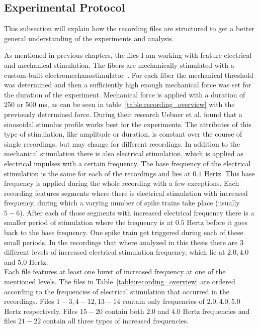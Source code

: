 \subsection{Experimental Protocol}
This subsection will explain how the recording files are structured to get a better general understanding of the experiments and analysis.

As mentioned in previous chapters, the files I am working with feature electrical and mechanical stimulation. The fibers are mechanically stimulated with a custom-built electromechanostimulator~\cite{roberto}. For each fiber the mechanical threshold was determined and then a sufficiently high enough mechanical force was set for the duration of the experiment.
Mechanical force is applied with a duration of 250 or 500 ms, as can be seen in table~\ref{table:recording_overview} with the previously determined force. During their research Uebner et al. found that a sinosoidal stimulus profile works best for the experiments. The attributes of this type of stimulation, like amplitude or duration, is constant over the course of single recordings, but may change  for different recordings. In addition to the mechanical stimulation there is also electrical stimulation, which is applied as electrical impulses with a certain frequency. The base frequency of the electrical stimulation is the same for each of the recordings and lies at $0.1$ Hertz. This base frequency is applied during the whole recording with a few exceptions. Each recording features segments where there is electrical stimulation with increased frequency, during which a varying number of spike trains take place (usually $5-6$). After each of those segments with increased electrical frequency there is a smaller period of stimulation where the frequency is at $0.5$ Hertz before it goes back to the base frequency. One spike train get triggered during each of these small periods. In the recordings that where analyzed in this thesis there are 3 different levels of increased electrical stimulation frequency, which lie at $2.0, 4.0$ and $5.0$ Hertz.\\
Each file features at least one burst of increased frequency at one of the mentioned levels. The files in Table~\ref{table:recording_overview} are ordered according to the frequencies of electrical stimulation that occurred in the recordings. Files $1-3, 4-12, 13-14$ contain only frequencies of $2.0, 4.0, 5.0$ Hertz respectively. Files $15-20$ contain both $2.0$ and $4.0$ Hertz frequencies and files $21-22$ contain all three types of increased frequencies.\\

